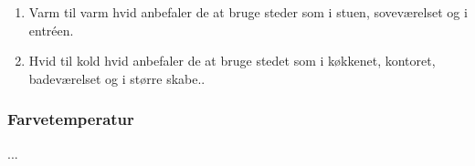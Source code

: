 \begin{enumerate}
\item Varm til varm hvid anbefaler de at bruge steder som i stuen, soveværelset og i entréen.
\item Hvid til kold hvid anbefaler de at bruge stedet som i køkkenet, kontoret, badeværelset og i større skabe.\cite{varm_kold}.
\end{enumerate}

\subsubsection{Farvetemperatur}
...




